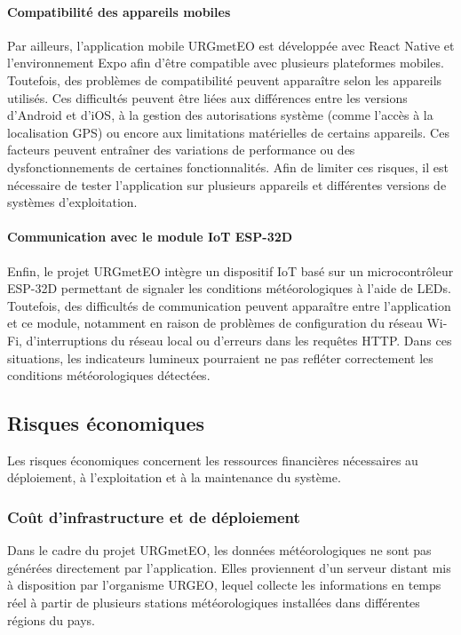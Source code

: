 \paragraph{Compatibilité des appareils mobiles}

Par ailleurs, l’application mobile URGmetEO est développée avec React Native et l’environnement Expo afin d’être compatible avec plusieurs plateformes mobiles. Toutefois, des problèmes de compatibilité peuvent apparaître selon les appareils utilisés. Ces difficultés peuvent être liées aux différences entre les versions d’Android et d’iOS, à la gestion des autorisations système (comme l’accès à la localisation GPS) ou encore aux limitations matérielles de certains appareils. Ces facteurs peuvent entraîner des variations de performance ou des dysfonctionnements de certaines fonctionnalités. Afin de limiter ces risques, il est nécessaire de tester l’application sur plusieurs appareils et différentes versions de systèmes d’exploitation.

\paragraph{Communication avec le module IoT ESP-32D}

Enfin, le projet URGmetEO intègre un dispositif IoT basé sur un microcontrôleur ESP-32D permettant de signaler les conditions météorologiques à l’aide de LEDs. Toutefois, des difficultés de communication peuvent apparaître entre l’application et ce module, notamment en raison de problèmes de configuration du réseau Wi-Fi, d’interruptions du réseau local ou d’erreurs dans les requêtes HTTP. Dans ces situations, les indicateurs lumineux pourraient ne pas refléter correctement les conditions météorologiques détectées.
\subsection{Risques économiques}

Les risques économiques concernent les ressources financières nécessaires au déploiement, à l’exploitation et à la maintenance du système.

\subsubsection{Coût d’infrastructure et de déploiement}

Dans le cadre du projet URGmetEO, les données météorologiques ne sont pas générées directement par l’application. Elles proviennent d’un serveur distant mis à disposition par l’organisme URGEO, lequel collecte les informations en temps réel à partir de plusieurs stations météorologiques installées dans différentes régions du pays.\\

